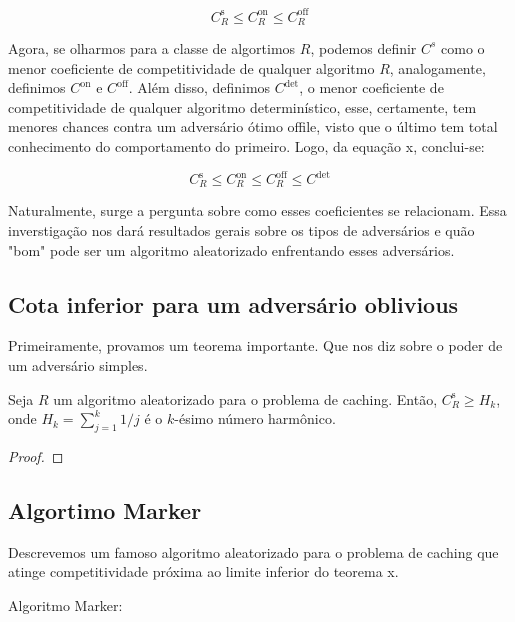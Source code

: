 \begin{equation}
  C_R^{\text{s}} \leqslant C_R^{\text{on}} \leqslant C_R^{\text{off}}
\end{equation}

Agora, se olharmos para a classe de algortimos \(R\), podemos definir \(C^{s}\) como o menor coeficiente de competitividade de qualquer algoritmo \(R\), analogamente, definimos \(C^\text{{on}}\) e \(C^\text{{off}}\). Além disso, definimos \(C^{\text{det}}\), o menor coeficiente de competitividade de qualquer algoritmo determinístico, esse, certamente, tem menores chances contra um adversário ótimo offile, visto que o último tem total conhecimento do comportamento do primeiro. Logo, da equação x, conclui-se:

\begin{equation}
  C_R^{\text{s}} \leqslant C_R^{\text{on}} \leqslant C_R^{\text{off}} \leqslant C^{\text{det}}
\end{equation}

Naturalmente, surge a pergunta sobre como esses coeficientes se relacionam. Essa inverstigação nos dará resultados gerais sobre os tipos de adversários e quão "bom" pode ser um algoritmo aleatorizado enfrentando esses adversários.


\subsection{Cota inferior para um adversário oblivious}

Primeiramente, provamos um teorema importante. Que nos diz sobre o poder de um adversário simples.

\begin{theorem}
  Seja \(R\) um algoritmo aleatorizado para o problema de caching. Então, \(C_R^{\text{s}} \geqslant H_k\), onde \(H_k = \sum_{j = 1}^{k} 1/j\) é o \(k\)-ésimo número harmônico.
  \begin{proof}
  \end{proof}
\end{theorem}


\subsection{Algortimo Marker}

Descrevemos um famoso algoritmo aleatorizado para o problema de caching que atinge competitividade próxima ao limite inferior do teorema x.

Algoritmo Marker: 

